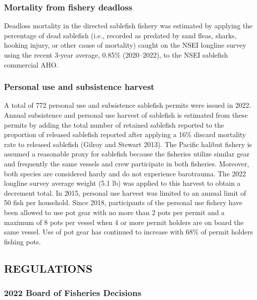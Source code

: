 \documentclass[
]{article}
\begin{document}
\hypertarget{mortality-from-fishery-deadloss}{%
\subsubsection{Mortality from fishery
deadloss}\label{mortality-from-fishery-deadloss}}

Deadloss mortality in the directed sablefish fishery was estimated by
applying the percentage of dead sablefish (i.e., recorded as predated by
sand fleas, sharks, hooking injury, or other cause of mortality) caught
on the NSEI longline survey using the recent 3-year average, 0.85\%
(2020--2022), to the NSEI sablefish commercial AHO.

\hypertarget{personal-use-and-subsistence-harvest}{%
\subsubsection{Personal use and subsistence
harvest}\label{personal-use-and-subsistence-harvest}}

A total of 772 personal use and subsistence sablefish permits were
issued in 2022. Annual subsistence and personal use harvest of sablefish
is estimated from these permits by adding the total number of retained
sablefish reported to the proportion of released sablefish reported
after applying a 16\% discard mortality rate to released sablefish
(Gilroy and Stewart 2013). The Pacific halibut fishery is assumed a
reasonable proxy for sablefish because the fisheries utilize similar
gear and frequently the same vessels and crew participate in both
fisheries. Moreover, both species are considered hardy and do not
experience barotrauma. The 2022 longline survey average weight (5.1 lb)
was applied to this harvest to obtain a decrement total. In 2015,
personal use harvest was limited to an annual limit of 50 fish per
household. Since 2018, participants of the personal use fishery have
been allowed to use pot gear with no more than 2 pots per permit and a
maximum of 8 pots per vessel when 4 or more permit holders are on board
the same vessel. Use of pot gear has continued to increase with 68\% of
permit holders fishing pots.

\hypertarget{regulations}{%
\subsection{REGULATIONS}\label{regulations}}

\hypertarget{board-of-fisheries-decisions}{%
\subsubsection{2022 Board of Fisheries
Decisions}\label{board-of-fisheries-decisions}}
\end{document}
